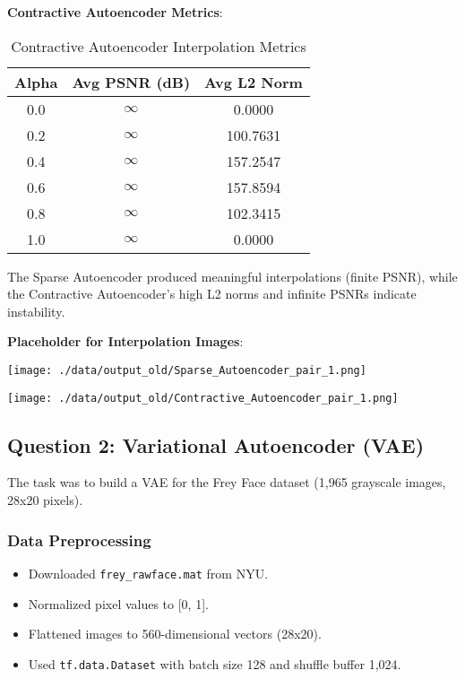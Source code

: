 \documentclass[12pt]{article}
\begin{document}
	\textbf{Contractive Autoencoder Metrics}:
	\begin{table}[h]
		\centering
		\begin{tabular}{ccc}
			\toprule
			Alpha & Avg PSNR (dB) & Avg L2 Norm \\
			\midrule
			0.0 & $\infty$ & 0.0000 \\
			0.2 & $\infty$ & 100.7631 \\
			0.4 & $\infty$ & 157.2547 \\
			0.6 & $\infty$ & 157.8594 \\
			0.8 & $\infty$ & 102.3415 \\
			1.0 & $\infty$ & 0.0000 \\
			\bottomrule
		\end{tabular}
		\caption{Contractive Autoencoder Interpolation Metrics}
	\end{table}
	The Sparse Autoencoder produced meaningful interpolations (finite PSNR), while the Contractive Autoencoder's high L2 norms and infinite PSNRs indicate instability.
	
	\textbf{Placeholder for Interpolation Images}:
	\begin{center}
		\texttt{[image: ./data/output\_old/Sparse\_Autoencoder\_pair\_1.png]}
	\end{center}
	\begin{center}
		\texttt{[image: ./data/output\_old/Contractive\_Autoencoder\_pair\_1.png]}
	\end{center}
	
	\subsection{Question 2: Variational Autoencoder (VAE)}
	The task was to build a VAE for the Frey Face dataset (1,965 grayscale images, 28x20 pixels).
	
	\subsubsection{Data Preprocessing}
	\begin{itemize}
		\item Downloaded \texttt{frey_rawface.mat} from NYU.
		\item Normalized pixel values to [0, 1].
		\item Flattened images to 560-dimensional vectors (28x20).
		\item Used \texttt{tf.data.Dataset} with batch size 128 and shuffle buffer 1,024.
	\end{itemize}
	
\end{document}
